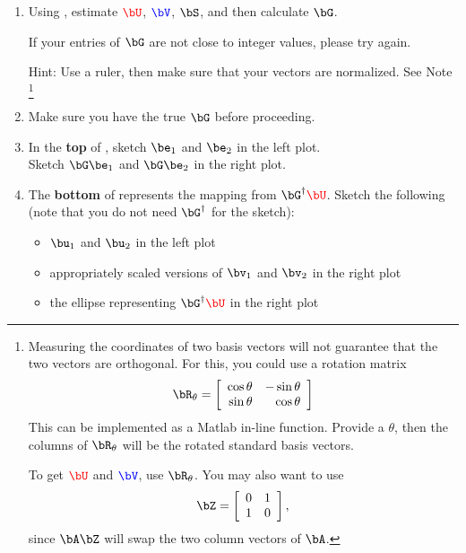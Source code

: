 \documentclass[11pt,titlepage,fleqn]{article}
\begin{document}
\begin{enumerate}
\item Using , estimate $\Ucolor$, $\Vcolor$, $\bS$, and then calculate $\bG$.

If your entries of $\bG$ are not close to integer values, please try again.

Hint: Use a ruler, then make sure that your vectors are normalized. See Note \footnote{
Measuring the coordinates of two basis vectors will not guarantee that the two vectors are orthogonal. For this, you could use a rotation matrix
%
\begin{equation}
\bR_\theta = \left[
\begin{array}{rr}
\cos\theta & -\sin\theta \\ 
\sin\theta & \cos\theta
\end{array}
\right]
\end{equation}
%
This can be implemented as a Matlab in-line function. Provide a $\theta$, then the columns of $\bR_\theta$ will be the rotated standard basis vectors.

To get $\Ucolor$ and $\Vcolor$, use $\bR_\theta$. You may also want to use
%
\begin{equation}
\bZ = \left[
\begin{array}{rr}
0 & 1 \\ 
1 & 0
\end{array}
\right],
\end{equation}
%
since $\bA\bZ$ will swap the two column vectors of $\bA$.
}

\item Make sure you have the true $\bG$ before proceeding.

\item In the {\bf top} of , sketch $\be_1$ and $\be_2$ in the left plot. \\
Sketch $\bG\be_1$ and $\bG\be_2$ in the right plot.

\item The {\bf bottom} of  represents the mapping from $\bG^{\dagger}\Ucolor$. Sketch the following (note that you do not need $\bG^{\dagger}$ for the sketch):
%
\begin{itemize}
\item $\bu_1$ and $\bu_2$ in the left plot
\item appropriately scaled versions of $\bv_1$ and $\bv_2$ in the right plot
\item the ellipse representing $\bG^{\dagger}\Ucolor$ in the right plot
\end{itemize}


\end{enumerate}
\end{document}
